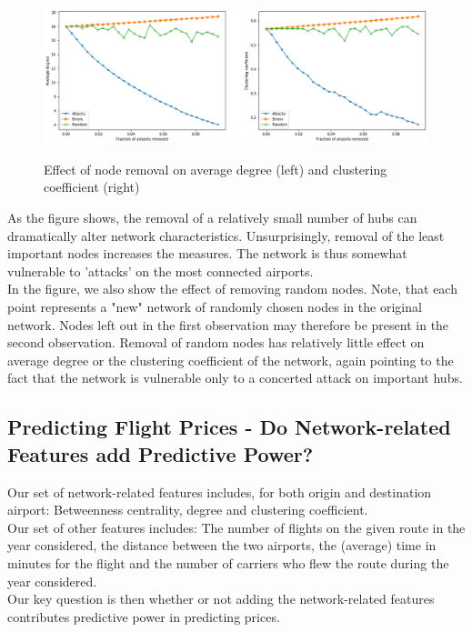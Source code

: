 \begin{figure}[H]
  \centering
  \caption{Effect of node removal on average degree (left) and clustering coefficient (right)}
    \includegraphics[width=1. \textwidth]{Exam/Figures/attacksanderrors.png}
  \label{fig:attacks_and_errors}
\end{figure}
As the figure shows, the removal of a relatively small number of hubs can dramatically alter network characteristics. Unsurprisingly, removal of the least important nodes increases the measures. The network is thus somewhat vulnerable to 'attacks' on the most connected airports. \\ In the figure, we also show the effect of removing random nodes. Note, that each point represents a "new" network of randomly chosen nodes in the original network. Nodes left out in the first observation may therefore be present in the second observation.  Removal of random nodes has relatively little effect on average degree or the clustering coefficient of the network, again pointing to the fact that the network is vulnerable only to a concerted attack on important hubs. \\ 

\subsection{Predicting Flight Prices - Do Network-related Features add Predictive Power?}
Our set of network-related features includes, for both origin and destination airport: Betweenness centrality, degree and clustering coefficient. \\
Our set of other features includes: The number of flights on the given route in the year considered, the distance between the two airports, the (average) time in minutes for the flight and the number of carriers who flew the route during the year considered. \\
Our key question is then whether or not adding the network-related features contributes predictive power in predicting prices. 

